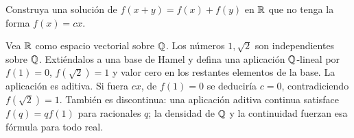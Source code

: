 \begin{ejercicio}\label{ej:v3-l01-4}
Construya una solución de $f(x+y)=f(x)+f(y)$ en $\mathbb R$ que no tenga la forma $f(x)=cx$.
\end{ejercicio}
\begin{solucion}
Vea $\mathbb R$ como espacio vectorial sobre $\mathbb Q$. Los números $1,\sqrt2$ son independientes sobre $\mathbb Q$. Extiéndalos a una base de Hamel y defina una aplicación $\mathbb Q$-lineal por $f(1)=0$, $f(\sqrt2)=1$ y valor cero en los restantes elementos de la base. La aplicación es aditiva. Si fuera $cx$, de $f(1)=0$ se deduciría $c=0$, contradiciendo $f(\sqrt2)=1$. También es discontinua: una aplicación aditiva continua satisface $f(q)=qf(1)$ para racionales $q$; la densidad de $\mathbb Q$ y la continuidad fuerzan esa fórmula para todo real.
\end{solucion}

